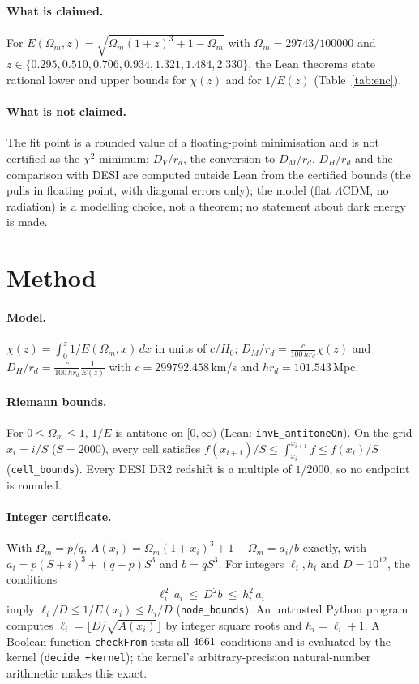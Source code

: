 \documentclass[11pt]{article}
\theoremstyle{remark}
\begin{document}
\paragraph{What is claimed.} For $E(\Omega_m,z)=\sqrt{\Omega_m(1+z)^3+1-\Omega_m}$ with $\Omega_m=29743/100000$ and
$z\in\{0.295, 0.510, 0.706, 0.934, 1.321, 1.484, 2.330\}$, the Lean theorems state rational lower and upper bounds for
$\chi(z)$ and for $1/E(z)$ (Table~\ref{tab:enc}). \paragraph{What is not claimed.} The fit point is a rounded value of a
floating-point minimisation and is not certified as the $\chi^2$ minimum; $D_V/r_d$, the conversion to $D_M/r_d$,
$D_H/r_d$ and the comparison with DESI are computed outside Lean from the certified bounds (the pulls in floating point, with diagonal errors only); the model (flat $\Lambda$CDM,
no radiation) is a modelling choice, not a theorem; no statement about dark energy is made.

\section{Method}
\paragraph{Model.} $\chi(z)=\int_0^z 1/E(\Omega_m,x)\,dx$ in units of $c/H_0$; $D_M/r_d=\frac{c}{100\,h r_d}\chi(z)$ and
$D_H/r_d=\frac{c}{100\,hr_d}\frac{1}{E(z)}$ with $c=299792.458$\,km/s and $h r_d=101.543$\,Mpc.

\paragraph{Riemann bounds.} For $0\le\Omega_m\le1$, $1/E$ is antitone on $[0,\infty)$ (Lean: \texttt{invE\_antitoneOn}). On the grid
$x_i=i/S$ ($S=2000$), every cell satisfies $f(x_{i+1})/S\le\int_{x_i}^{x_{i+1}}f\le f(x_i)/S$ (\texttt{cell\_bounds}). Every DESI DR2
redshift is a multiple of $1/2000$, so no endpoint is rounded.

\paragraph{Integer certificate.} With $\Omega_m=p/q$, $A(x_i)=\Omega_m(1+x_i)^3+1-\Omega_m=a_i/b$ exactly, with
$a_i=p(S+i)^3+(q-p)S^3$ and $b=qS^3$. For integers $\ell_i,h_i$ and $D=10^{12}$, the conditions
\[ \ell_i^2\,a_i\ \le\ D^2 b\ \le\ h_i^2\,a_i \]
imply $\ell_i/D\le 1/E(x_i)\le h_i/D$ (\texttt{node\_bounds}). An untrusted Python program computes $\ell_i=\lfloor D/\sqrt{A(x_i)}\rfloor$
by integer square roots and $h_i=\ell_i+1$. A Boolean function \texttt{checkFrom} tests all $4661$ conditions and is evaluated
by the kernel (\texttt{decide +kernel}); the kernel's arbitrary-precision natural-number arithmetic makes this exact.
\end{document}
